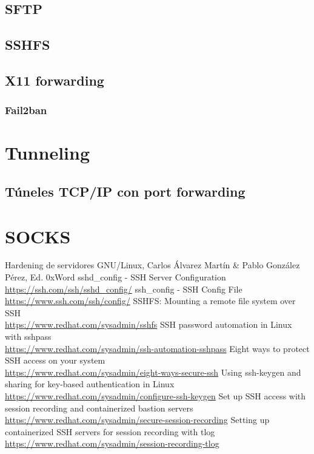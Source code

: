 \documentclass[a4paper, 11pt, titlepage]{article}
\begin{document}
    \subsection{SFTP}
    \subsection{SSHFS}
    \subsection{X11 forwarding}\label{X11Forwarding}
    \subsubsection{Fail2ban}
\section{Tunneling}
    \subsection{Túneles TCP/IP con port forwarding}
\section{SOCKS}

\newpage
\begin{thebibliography}{X}
    \bibitem{} Hardening de servidores GNU/Linux, Carlos Álvarez Martín \& Pablo González Pérez, Ed. 0xWord
    \bibitem{} sshd\_config - SSH Server Configuration \\ \url{https://ssh.com/ssh/sshd_config/}
    \bibitem{} ssh\_config - SSH Config File \\ \url{https://www.ssh.com/ssh/config/}
    \bibitem{} SSHFS: Mounting a remote file system over SSH \\ \url{https://www.redhat.com/sysadmin/sshfs}
    \bibitem{} SSH password automation in Linux with sshpass \\ \url{https://www.redhat.com/sysadmin/ssh-automation-sshpass}
    \bibitem{} Eight ways to protect SSH access on your system \\ \url{https://www.redhat.com/sysadmin/eight-ways-secure-ssh}
    \bibitem{} Using ssh-keygen and sharing for key-based authentication in Linux \\ \url{https://www.redhat.com/sysadmin/configure-ssh-keygen}
    \bibitem{} Set up SSH access with session recording and containerized bastion servers \\ \url{https://www.redhat.com/sysadmin/secure-session-recording}
    \bibitem{} Setting up containerized SSH servers for session recording with tlog \\ \url{https://www.redhat.com/sysadmin/session-recording-tlog}
\end{thebibliography}
\end{document}
